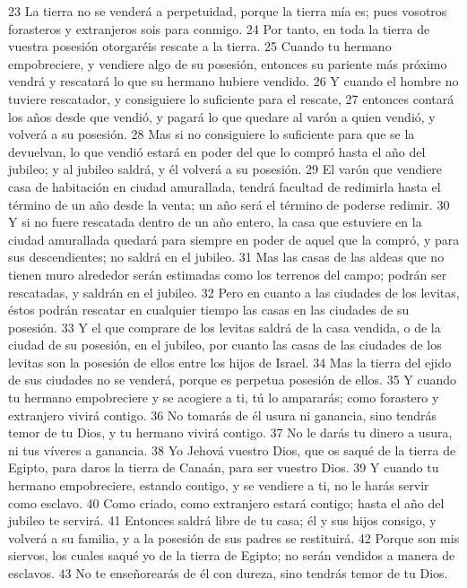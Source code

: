 23 La tierra no se venderá a perpetuidad, porque la tierra mía es; pues vosotros forasteros y extranjeros sois para conmigo.
24 Por tanto, en toda la tierra de vuestra posesión otorgaréis rescate a la tierra.
25 Cuando tu hermano empobreciere, y vendiere algo de su posesión, entonces su pariente más próximo vendrá y rescatará lo que su hermano hubiere vendido.
26 Y cuando el hombre no tuviere rescatador, y consiguiere lo suficiente para el rescate,
27 entonces contará los años desde que vendió, y pagará lo que quedare al varón a quien vendió, y volverá a su posesión.
28 Mas si no consiguiere lo suficiente para que se la devuelvan, lo que vendió estará en poder del que lo compró hasta el año del jubileo; y al jubileo saldrá, y él volverá a su posesión.
29 El varón que vendiere casa de habitación en ciudad amurallada, tendrá facultad de redimirla hasta el término de un año desde la venta; un año será el término de poderse redimir.
30 Y si no fuere rescatada dentro de un año entero, la casa que estuviere en la ciudad amurallada quedará para siempre en poder de aquel que la compró, y para sus descendientes; no saldrá en el jubileo.
31 Mas las casas de las aldeas que no tienen muro alrededor serán estimadas como los terrenos del campo; podrán ser rescatadas, y saldrán en el jubileo.
32 Pero en cuanto a las ciudades de los levitas, éstos podrán rescatar en cualquier tiempo las casas en las ciudades de su posesión.
33 Y el que comprare de los levitas saldrá de la casa vendida, o de la ciudad de su posesión, en el jubileo, por cuanto las casas de las ciudades de los levitas son la posesión de ellos entre los hijos de Israel.
34 Mas la tierra del ejido de sus ciudades no se venderá, porque es perpetua posesión de ellos.
35 Y cuando tu hermano empobreciere y se acogiere a ti, tú lo ampararás; como forastero y extranjero vivirá contigo.
36 No tomarás de él usura ni ganancia, sino tendrás temor de tu Dios, y tu hermano vivirá contigo.
37 No le darás tu dinero a usura, ni tus víveres a ganancia.
38 Yo Jehová vuestro Dios, que os saqué de la tierra de Egipto, para daros la tierra de Canaán, para ser vuestro Dios.
39 Y cuando tu hermano empobreciere, estando contigo, y se vendiere a ti, no le harás servir como esclavo.
40 Como criado, como extranjero estará contigo; hasta el año del jubileo te servirá.
41 Entonces saldrá libre de tu casa; él y sus hijos consigo, y volverá a su familia, y a la posesión de sus padres se restituirá.
42 Porque son mis siervos, los cuales saqué yo de la tierra de Egipto; no serán vendidos a manera de esclavos.
43 No te enseñorearás de él con dureza, sino tendrás temor de tu Dios.
